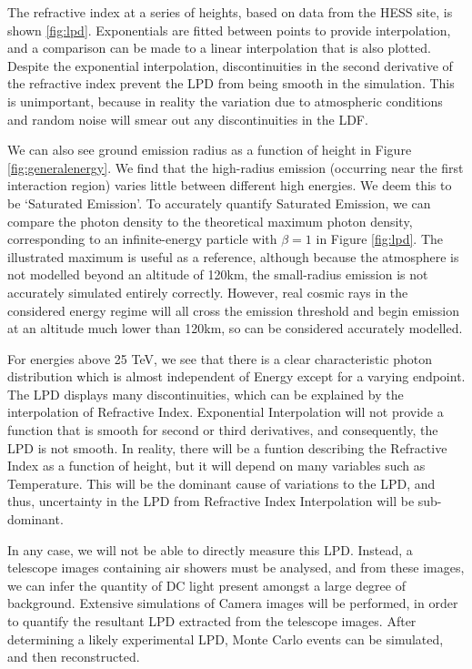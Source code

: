 \documentclass[11pt]{article}
\begin{document}
The refractive index at a series of heights, based on data from the HESS site, is shown \ref{fig:lpd}. Exponentials are fitted between points to provide interpolation, and a comparison can be made to a linear interpolation that is also plotted. Despite the exponential interpolation, discontinuities in the second derivative of the refractive index prevent the LPD from being smooth in the simulation. This is unimportant, because in reality the variation due to atmospheric conditions and random noise will smear out any discontinuities in the LDF.

We can also see ground emission radius as a function of height in Figure \ref{fig:generalenergy}. We find that the high-radius emission (occurring near the first interaction region) varies little between different high energies. We deem this to be \textquoteleft Saturated Emission\textquoteright. To accurately quantify Saturated Emission, we can compare the photon density to the theoretical maximum photon density, corresponding to an infinite-energy particle with $\beta =1$ in Figure \ref{fig:lpd}. The illustrated maximum is useful as a reference, although because the atmosphere is not modelled beyond an altitude of 120km, the small-radius emission is not accurately simulated entirely correctly. However, real cosmic rays in the considered energy regime will all cross the emission threshold and begin emission at an altitude much lower than 120km, so can be considered accurately modelled.

For energies above 25 TeV, we see that there is a clear characteristic photon distribution which is almost independent of Energy except for a varying endpoint. The LPD displays many discontinuities, which can be explained by the interpolation of Refractive Index. Exponential Interpolation will not provide a function that is smooth for second or third derivatives, and consequently, the LPD is not smooth. In reality, there will be a funtion describing the Refractive Index as a function of height, but it will depend on many variables such as Temperature. This will be the dominant cause of variations to the LPD, and thus, uncertainty in the LPD from Refractive Index Interpolation will be sub-dominant.

In any case, we will not be able to directly measure this LPD. Instead, a telescope images containing air showers must be analysed, and from these images, we can infer the quantity of DC light present amongst a large degree of background. Extensive simulations of Camera images will be performed, in order to quantify the resultant LPD extracted from the telescope images. After determining a likely experimental LPD, Monte Carlo events can be simulated, and then reconstructed. 
\end{document}
